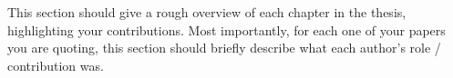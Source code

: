 \authorcontributions

This section should give a rough overview of each chapter in the thesis, highlighting your contributions.  Most importantly, for each one of your papers you are quoting, this section should briefly describe what each author's role / contribution was.

